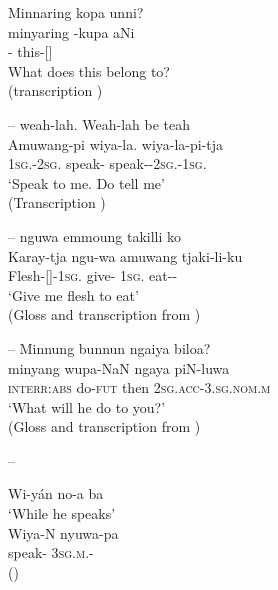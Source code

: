 \documentclass{langscibook}
\begin{document}
\begin{xlist}
\ea\label{ex:3:3-22}
\glll Minnaring kopa	 unni?  \\
minyaring -kupa 	 aNi  \\
-	 this-[] \\
\glt What does this belong to? \\
(transcription \citealt[51]{lissarrague_salvage_2006})
\z




--
\ea\label{ex:3:23}
	{weah-lah.}	{Weah-lah be teah} \\
Amuwang-pi 	wiya-la.          	wiya-la-pi-tja \\
1\textsc{sg}.-2\textsc{sg}. 	speak- 	speak--2\textsc{sg}.-1\textsc{sg}. \\
\glt `Speak to me. Do tell me' \\
(Transcription \citealt[46]{lissarrague_salvage_2006}) 
\z




--
\ea\label{ex:3:24}
      		 nguwa   	 emmoung    	 takilli ko \\
Karay-tja  		 ngu-wa  	 amuwang             tjaki-li-ku \\
Flesh-[]-1\textsc{sg}.	 give- 	1\textsc{sg}.		 eat-- \\
\glt `Give me flesh to eat' \\
(Gloss and transcription from \citealt[42]{lissarrague_salvage_2006})
\z




--
\ea\label{ex:3:25}
\glll Minnung 	bunnun 	        ngaiya 	biloa?  \\
minyang 	wupa-NaN    ngaya 	piN-luwa \\
\textsc{interr:abs}	do-\textsc{fut} 	      then 	2\textsc{sg}.\textsc{acc}-3.\textsc{sg}.\textsc{nom}.\textsc{m} \\
\glt `What will he do to you?' \\
(Gloss and transcription from \citealt[42]{lissarrague_salvage_2006})
\z




--
\ea\label{ex:3:26}
\begin{xlist}
\ex Wi-yán    no-a   ba \\
\glt `While he speaks' \\
\ex
\gll Wiya-N		nyuwa-pa \\
speak-	3\textsc{sg}.\textsc{m}.- \\
\glt (\citealt[70]{threlkeld_australian_1834})
\end{xlist}
\z


\end{xlist}
\end{document}
